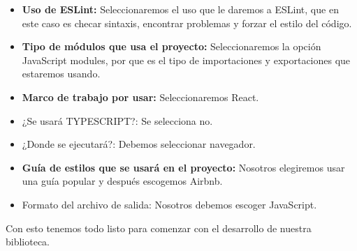    \begin{itemize}
    \item \textbf{Uso de ESLint:  }Seleccionaremos el uso que le daremos a ESLint, que en este caso es checar sintaxis, encontrar problemas y forzar el estilo del código.
    \item \textbf{Tipo de módulos que usa el proyecto:} Seleccionaremos la opción JavaScript modules, por que es el tipo de importaciones y exportaciones que estaremos usando.
    \item \textbf{Marco de trabajo por usar: }Seleccionaremos React.
    \item ¿Se usará TYPESCRIPT?: Se selecciona no. 
    \item ¿Donde se ejecutará?: Debemos seleccionar navegador.
    \item \textbf{Guía de estilos que se usará en el proyecto: } Nosotros elegiremos usar una guía popular  y después escogemos Airbnb.
    \item Formato del archivo de salida: Nosotros debemos escoger JavaScript.
    \end{itemize}
    Con esto tenemos todo listo para comenzar con el desarrollo de nuestra biblioteca.
    \newpage

